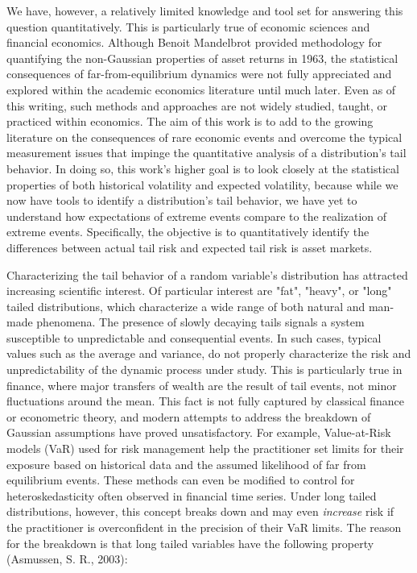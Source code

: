 \documentclass[11pt,a4paper,oldfontcommands]{memoir}
\begin{document}
{We have, however, a relatively limited knowledge and tool set for answering this question quantitatively. This is particularly true of economic sciences and financial economics. Although Benoit Mandelbrot provided methodology for quantifying the non-Gaussian properties of asset returns in 1963, the statistical consequences of far-from-equilibrium dynamics were not fully appreciated and explored within the academic economics literature until much later. Even as of this writing, such methods and approaches are not widely studied, taught, or practiced within economics. The aim of this work is to add to the growing literature on the consequences of rare economic events and overcome the typical measurement issues that impinge the quantitative analysis of a distribution's tail behavior. In doing so, this work's higher goal is to look closely at the statistical properties of both historical volatility and expected volatility, because while we now have tools to identify a distribution's tail behavior, we have yet to understand how expectations of extreme events compare to the realization of extreme events. Specifically, the objective is to quantitatively identify the differences between actual tail risk and expected tail risk is asset markets.


Characterizing the tail behavior of a random variable's distribution has attracted increasing scientific interest. Of particular interest are "fat", "heavy", or "long" tailed distributions, which characterize a wide range of both natural and man-made phenomena. The presence of slowly decaying tails signals a system susceptible to unpredictable and consequential events. In such cases, typical values such as the average and variance, do not properly characterize the risk and unpredictability of the dynamic process under study. This is particularly true in finance, where major transfers of wealth are the result of tail events, not minor fluctuations around the mean. This fact is not fully captured by classical finance or econometric theory, and modern attempts to address the breakdown of Gaussian assumptions have proved unsatisfactory. For example, Value-at-Risk models (VaR) used for risk management help the practitioner set limits for their exposure based on historical data and the assumed likelihood of far from equilibrium events. These methods can even be modified to control for heteroskedasticity often observed in financial time series. Under long tailed distributions, however, this concept breaks down and may even \textit{increase} risk if the practitioner is overconfident in the precision of their VaR limits. The reason for the breakdown is that long tailed variables have the following property (Asmussen, S. R., 2003):

}
\end{document}
